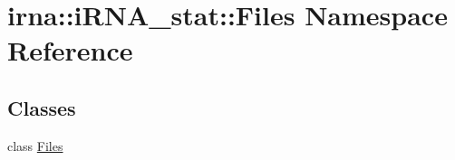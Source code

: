 \hypertarget{namespaceirna_1_1iRNA__stat_1_1Files}{
\section{irna\-:\-:i\-R\-N\-A\-\_\-stat\-:\-:\-Files \-Namespace \-Reference}
\label{namespaceirna_1_1iRNA__stat_1_1Files}
}
\subsection*{\-Classes}
\begin{DoxyCompactItemize}
\item 
class \hyperlink{classirna_1_1iRNA__stat_1_1Files_1_1Files}{\-Files}
\end{DoxyCompactItemize}
